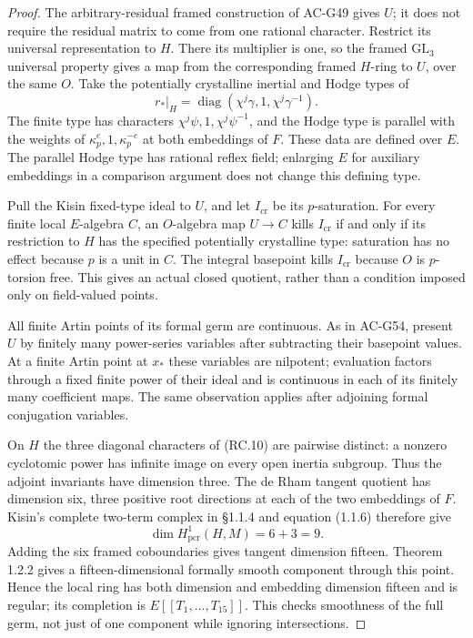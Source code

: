 \begin{proof}
The arbitrary-residual framed construction of AC-G49
gives \(U\); it does not require the residual matrix
to come from one rational character.  Restrict its
universal representation to \(H\).  There its multiplier
is one, so the framed \(\mathrm{GL}_3\) universal property
gives a map from the corresponding framed \(H\)-ring to
\(U\), over the same \(O\).
Take the potentially crystalline inertial and Hodge
types of
\[
 r_*|_H=\operatorname{diag}(\chi^j\gamma,1,
                                      \chi^j\gamma^{-1}).
 \tag{RC.10}
\]
The finite type has characters
\(\chi^j\psi,1,\chi^j\psi^{-1}\), and the Hodge type is
parallel with the weights of
\(\kappa_p^e,1,\kappa_p^{-e}\) at both embeddings of \(F\).
These data are defined over \(E\).  The parallel Hodge
type has rational reflex field; enlarging \(E\) for
auxiliary embeddings in a comparison argument does
not change this defining type.

Pull the Kisin fixed-type ideal to \(U\), and let
\(I_{\mathrm{cr}}\) be its \(p\)-saturation.
For every finite local \(E\)-algebra \(C\), an
\(O\)-algebra map \(U\to C\) kills \(I_{\mathrm{cr}}\)
if and only if its restriction to \(H\) has the
specified potentially crystalline type: saturation
has no effect because \(p\) is a unit in \(C\).
The integral basepoint kills \(I_{\mathrm{cr}}\)
because \(O\) is \(p\)-torsion free.
This gives an actual closed quotient, rather than
a condition imposed only on field-valued points.

All finite Artin points of its formal germ are
continuous.  As in AC-G54, present \(U\) by finitely
many power-series variables after subtracting their
basepoint values.  At a finite Artin point at \(x_*\)
these variables are nilpotent; evaluation factors
through a fixed finite power of their ideal and is
continuous in each of its finitely many coefficient
maps.  The same observation applies after adjoining
formal conjugation variables.

On \(H\) the three diagonal characters of (RC.10)
are pairwise distinct: a nonzero cyclotomic power
has infinite image on every open inertia subgroup.
Thus the adjoint invariants have dimension three.
The de Rham tangent quotient has dimension six,
three positive root directions at each of the two
embeddings of \(F\).
Kisin's complete two-term complex in \S1.1.4 and
equation (1.1.6) therefore give
\[
 \dim H^1_{\mathrm{pcr}}(H,M)=6+3=9.
\]
Adding the six framed coboundaries gives tangent
dimension fifteen.  Theorem 1.2.2 gives a
fifteen-dimensional formally smooth component
through this point.  Hence the local ring has both
dimension and embedding dimension fifteen and
is regular; its completion is \(E[[T_1,\ldots,T_{15}]]\).
This checks smoothness of the full germ, not just
of one component while ignoring intersections.


\end{proof}
